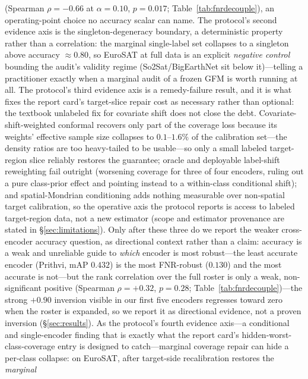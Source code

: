 \documentclass[11pt]{article}
\begin{document}
(Spearman $\rho=-0.66$ at $\alpha{=}0.10$, $p{=}0.017$; Table~\ref{tab:fnrdecouple}), an operating-point
choice no accuracy scalar can name. The protocol's second evidence axis is the singleton-degeneracy boundary, a
deterministic property rather than a correlation: the marginal single-label set collapses to a singleton
above accuracy $\approx0.80$, so EuroSAT at full data is an explicit \emph{negative control} bounding the
audit's validity regime (So2Sat/BigEarthNet sit below it)---telling a practitioner exactly when a marginal
audit of a frozen GFM is worth running at all. The protocol's third evidence axis is a remedy-failure result, and it is what fixes the
report card's target-slice repair cost as necessary rather than optional: the
textbook unlabeled fix for covariate shift does not close the debt. Covariate-shift-weighted conformal
\citep{tibshirani2019covariate} recovers only part of the coverage loss because its weights' effective
sample size collapses to $0.1$--$1.6\%$ of the calibration set---the density ratios are too heavy-tailed to
be usable---so only a small labeled target-region slice reliably restores the guarantee; oracle and
deployable label-shift reweighting fail outright (worsening coverage for three of four encoders, ruling
out a pure class-prior effect and pointing instead to a within-class conditional shift); and
spatial-Mondrian conditioning adds nothing measurable over non-spatial target calibration, so the
operative axis the protocol reports is access to labeled target-region data, not a new estimator (scope
and estimator provenance are stated in \S\ref{sec:limitations}). Only after these three do we report
the weaker cross-encoder accuracy question, as directional context rather than a claim: accuracy is a weak
and unreliable guide to \emph{which} encoder is most robust---the least accurate encoder (Prithvi, mAP
$0.432$) is the most FNR-robust ($0.130$) and the most accurate is not---but the rank correlation over the
full roster is only a weak, non-significant positive (Spearman $\rho=+0.32$, $p{=}0.28$;
Table~\ref{tab:fnrdecouple})---the strong $+0.90$ inversion visible in our first five encoders regresses
toward zero when the roster is expanded, so we report it as directional evidence, not a proven inversion
(\S\ref{sec:results}). As the protocol's fourth evidence axis---a conditional and single-encoder finding that is exactly what
the report card's hidden-worst-class-coverage entry is designed to catch---marginal coverage repair can
hide a per-class collapse: on EuroSAT, after target-side recalibration restores the \emph{marginal}
\end{document}
